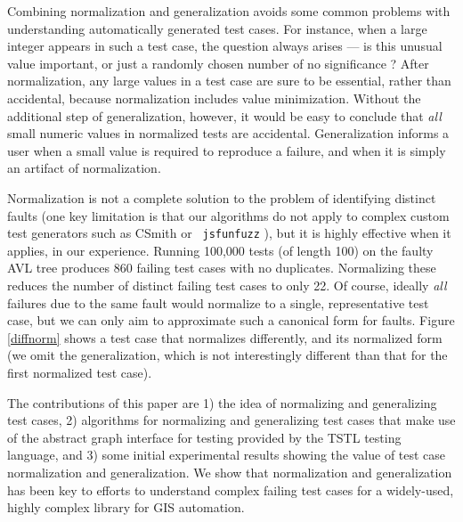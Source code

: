 Combining normalization and generalization avoids some common problems
with understanding automatically generated test cases.  For instance,
when a large integer appears in such a test case, the question always
arises --- is this unusual value important, or just a randomly chosen
number of no significance \cite{MakeMost}?  After normalization, any
large values in a test case are sure to be essential, rather than
accidental, because normalization includes value minimization.
Without the additional step of generalization, however, it would be
easy to conclude that \emph{all} small numeric values in normalized tests are
accidental.  Generalization informs a user when a small value is
required to reproduce a failure, and when it is simply an artifact of normalization.

Normalization is not a complete solution to the problem of
identifying distinct faults (one key limitation is that our algorithms do not apply to
complex custom test generators such as CSmith \cite{csmith} or {\tt
  jsfunfuzz} \cite{jsfunfuzz}), but it is highly effective when it applies,
in our experience.
Running 100,000 tests (of length 100) on the faulty AVL tree produces
860 failing test cases with no duplicates.  Normalizing these reduces
the number of distinct failing test cases to only 22.  Of course,
ideally \emph{all} failures due to the same fault would normalize to a
single, representative test case, but we can only aim to approximate
such a canonical form for faults.  Figure \ref{diffnorm} shows a test
case that normalizes differently, and its normalized form (we omit the
generalization, which is not interestingly different than that for the
first normalized test case).

The contributions of this paper are 1) the idea of normalizing and
generalizing test cases, 2) algorithms for normalizing and
generalizing test cases that make use of the abstract graph interface
for testing provided by the TSTL \cite{NFM15,ISSTA15} testing
language, and 3) some initial experimental results showing the value
of test case normalization and generalization.  We show that
normalization and generalization has been key to efforts to understand
complex failing test cases for a widely-used, highly complex library
for GIS automation.

